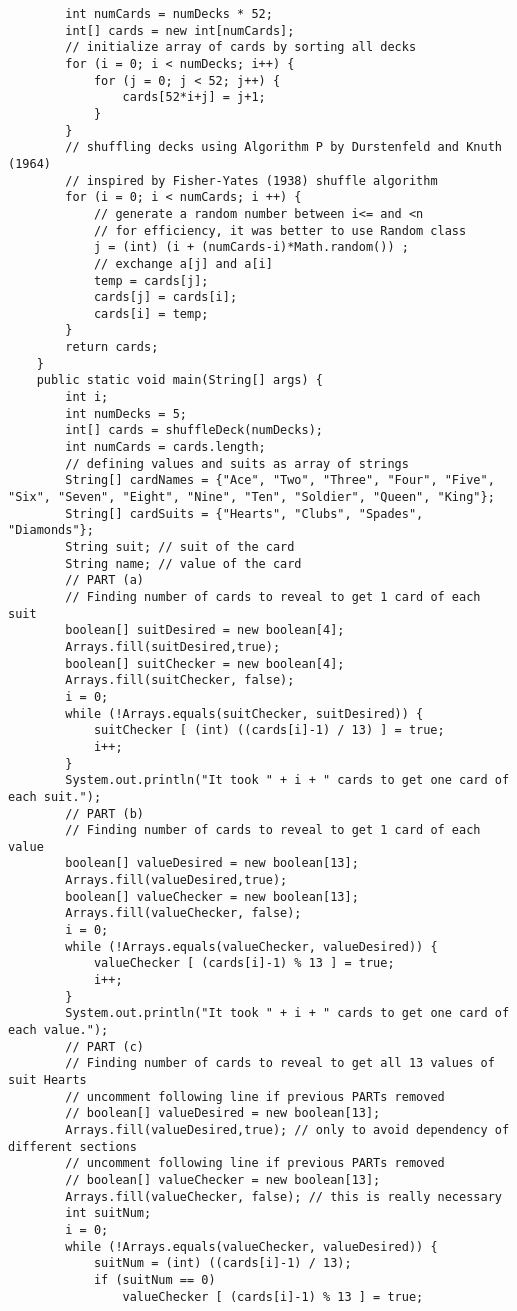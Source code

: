 \begin{enumerate}
\begin{lstlisting}
		int numCards = numDecks * 52;
		int[] cards = new int[numCards];
		// initialize array of cards by sorting all decks
		for (i = 0; i < numDecks; i++) {
			for (j = 0; j < 52; j++) {
				cards[52*i+j] = j+1;
			}
		}
		// shuffling decks using Algorithm P by Durstenfeld and Knuth (1964)
		// inspired by Fisher-Yates (1938) shuffle algorithm
		for (i = 0; i < numCards; i ++) {
			// generate a random number between i<= and <n
			// for efficiency, it was better to use Random class
			j = (int) (i + (numCards-i)*Math.random()) ;
			// exchange a[j] and a[i]
			temp = cards[j];
			cards[j] = cards[i];
			cards[i] = temp;
		}
		return cards;
	}
	public static void main(String[] args) {
		int i;
		int numDecks = 5;
		int[] cards = shuffleDeck(numDecks);
		int numCards = cards.length;
		// defining values and suits as array of strings
		String[] cardNames = {"Ace", "Two", "Three", "Four", "Five", "Six", "Seven", "Eight", "Nine", "Ten", "Soldier", "Queen", "King"};
		String[] cardSuits = {"Hearts", "Clubs", "Spades", "Diamonds"};
		String suit; // suit of the card
		String name; // value of the card
		// PART (a)
		// Finding number of cards to reveal to get 1 card of each suit
		boolean[] suitDesired = new boolean[4];
		Arrays.fill(suitDesired,true);
		boolean[] suitChecker = new boolean[4];
		Arrays.fill(suitChecker, false);
		i = 0;
		while (!Arrays.equals(suitChecker, suitDesired)) {
			suitChecker [ (int) ((cards[i]-1) / 13) ] = true;
			i++;
		}
		System.out.println("It took " + i + " cards to get one card of each suit.");
		// PART (b)
		// Finding number of cards to reveal to get 1 card of each value
		boolean[] valueDesired = new boolean[13];
		Arrays.fill(valueDesired,true);
		boolean[] valueChecker = new boolean[13];
		Arrays.fill(valueChecker, false);
		i = 0;
		while (!Arrays.equals(valueChecker, valueDesired)) {
			valueChecker [ (cards[i]-1) % 13 ] = true;
			i++;
		}
		System.out.println("It took " + i + " cards to get one card of each value.");
		// PART (c)
		// Finding number of cards to reveal to get all 13 values of suit Hearts
		// uncomment following line if previous PARTs removed
		// boolean[] valueDesired = new boolean[13];
		Arrays.fill(valueDesired,true); // only to avoid dependency of different sections
		// uncomment following line if previous PARTs removed
		// boolean[] valueChecker = new boolean[13];
		Arrays.fill(valueChecker, false); // this is really necessary
		int suitNum;
		i = 0;
		while (!Arrays.equals(valueChecker, valueDesired)) {
			suitNum = (int) ((cards[i]-1) / 13);
			if (suitNum == 0)
				valueChecker [ (cards[i]-1) % 13 ] = true;

\end{lstlisting}
\end{enumerate}
